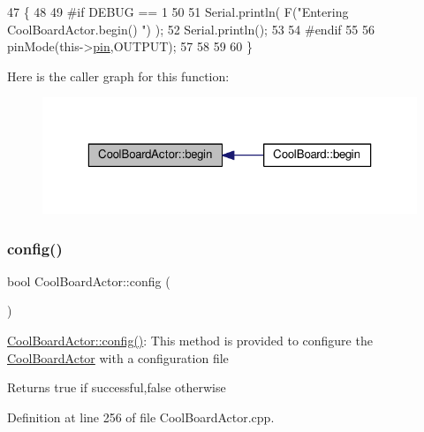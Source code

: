 \begin{DoxyCode}
47 \{
48 
49 \textcolor{preprocessor}{#if DEBUG == 1 }
50  
51     Serial.println( F(\textcolor{stringliteral}{"Entering CoolBoardActor.begin() "}) );
52     Serial.println();
53 
54 \textcolor{preprocessor}{#endif}
55 
56     pinMode(this->\hyperlink{class_cool_board_actor_a8b5c0b41fe6033b68d9e1ed00bc2e122}{pin},OUTPUT);
57     
58     
59 
60 \}
\end{DoxyCode}
Here is the caller graph for this function\+:\nopagebreak
\begin{figure}[H]
\begin{center}
\leavevmode
\includegraphics[width=323pt]{dc/d69/class_cool_board_actor_a7f4422fd85a5510bc2cdfd68e109be5e_icgraph}
\end{center}
\end{figure}
\mbox{\label{class_cool_board_actor_a5af5538fc7d169f63127e06d5219bcd4}} 
\subsubsection{\texorpdfstring{config()}{config()}}
{\footnotesize\ttfamily bool Cool\+Board\+Actor\+::config (\begin{DoxyParamCaption}{ }\end{DoxyParamCaption})}

\hyperlink{class_cool_board_actor_a5af5538fc7d169f63127e06d5219bcd4}{Cool\+Board\+Actor\+::config()}\+: This method is provided to configure the \hyperlink{class_cool_board_actor}{Cool\+Board\+Actor} with a configuration file

\begin{DoxyReturn}{Returns}
true if successful,false otherwise 
\end{DoxyReturn}


Definition at line 256 of file Cool\+Board\+Actor.\+cpp.


